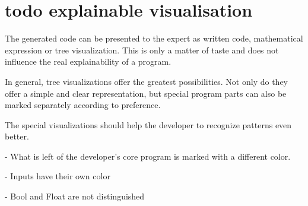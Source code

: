 \section{todo explainable visualisation}

The generated code can be presented to the expert as written code, mathematical expression or tree visualization. This is only a matter of taste and does not influence the real explainability of a program.

In general, tree visualizations offer the greatest possibilities. Not only do they offer a simple and clear representation, but special program parts can also be marked separately according to preference.

The special visualizations should help the developer to recognize patterns even better.

- What is left of the developer's core program is marked with a different color.

- Inputs have their own color

- Bool and Float are not distinguished